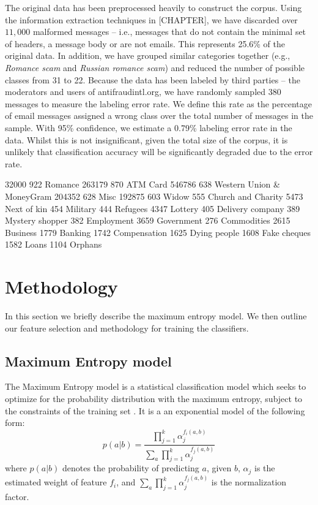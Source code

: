 The original data has been preprocessed heavily to construct the corpus. Using the information extraction techniques in [CHAPTER], we have discarded over $11,000$ malformed messages -- i.e., messages that do not contain the minimal set of headers, a message body or are not emails. This represents 25.6\% of the original data. In addition, we have grouped similar categories together (e.g., \textit{Romance scam} and \textit{Russian romance scam}) and reduced the number of possible classes from 31 to 22. Because the data has been labeled by third parties -- the moderators and users of antifraudintl.org, we have randomly sampled 380 messages to measure the labeling error rate. We define this rate as the percentage of email messages assigned a wrong class over the total number of messages in the sample. With 95\% confidence, we estimate a 0.79\% labeling error rate in the data. Whilst this is not insignificant, given the total size of the corpus, it is unlikely that classification accuracy will be significantly degraded due to the error rate. 

32000
922		Romance						263179
870		ATM Card						546786
638		Western Union \& MoneyGram	204352
628		Misc							192875
603		Widow
555		Church and Charity
5473	Next of kin
454		Military
444		Refugees
4347	Lottery
405		Delivery company
389		Mystery shopper
382		Employment
3659	Government
276		Commodities
2615	Business
1779	Banking
1742	Compensation
1625	Dying people
1608	Fake cheques
1582	Loans
1104	Orphans

\section{Methodology}
In this section we briefly describe the maximum entropy model. We then outline our feature selection and methodology for training the classifiers.
\subsection{Maximum Entropy model}
The Maximum Entropy model is a statistical classification model which seeks to optimize for the probability distribution with the maximum entropy, subject to the constraints of the training set . It is a an exponential model of the following form:
\begin{equation}
	p(a|b) = \frac{\prod_{j=1}^{k} \alpha_j^{f_i(a,b)}}{\sum_{a} \prod_{j=1}^{k} \alpha_j^{f_j(a,b)}}
\end{equation}
where $p(a|b)$ denotes the probability of predicting $a$, given $b$, $\alpha_{j}$ is the estimated weight of feature $f_{i}$, and $\sum_{a} \prod_{j=1}^{k} \alpha_j^{f_j(a,b)}$ is the normalization factor. 

